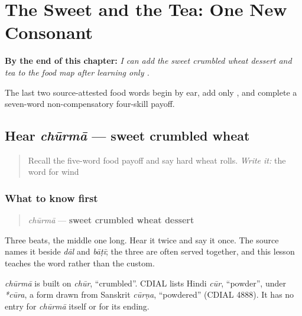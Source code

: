 
\chapter{The Sweet and the Tea: One New Consonant}
\label{ch:mw-food-seven}

\begin{chapteropening}
\textbf{By the end of this chapter:} \emph{I can add the sweet crumbled wheat dessert and tea to the food map after learning only .}

The last two source-attested food words begin by ear, add only , and complete a seven-word non-compensatory four-skill payoff.
\end{chapteropening}

\section[chūrmā]{Hear \emph{chūrmā} — sweet crumbled wheat}

\label{lesson:MW-C20-hear-churma}



\begin{quote}
Recall the five-word food payoff and say hard wheat rolls. \emph{Write it:} the word for wind
\end{quote}

\subsection*{What to know first}
\begin{quote}
\emph{chūrmā} — \textbf{sweet crumbled wheat dessert}
\end{quote}

Three beats, the middle one long. Hear it twice and say it once. The source names it beside \emph{dāl} and \emph{bāṭī}; the three are often served together, and this lesson teaches the word rather than the custom.

\begin{cousinweb}
\emph{chūrmā} is built on \emph{chūr}, \textquotedblleft{}crumbled\textquotedblright{}. CDIAL lists Hindi \emph{cūr}, \textquotedblleft{}powder\textquotedblright{}, under \emph{*cūra}, a form drawn from Sanskrit \emph{cūrṇa}, \textquotedblleft{}powdered\textquotedblright{} (CDIAL 4888). It has no entry for \emph{chūrmā} itself or for its ending.
\end{cousinweb}

